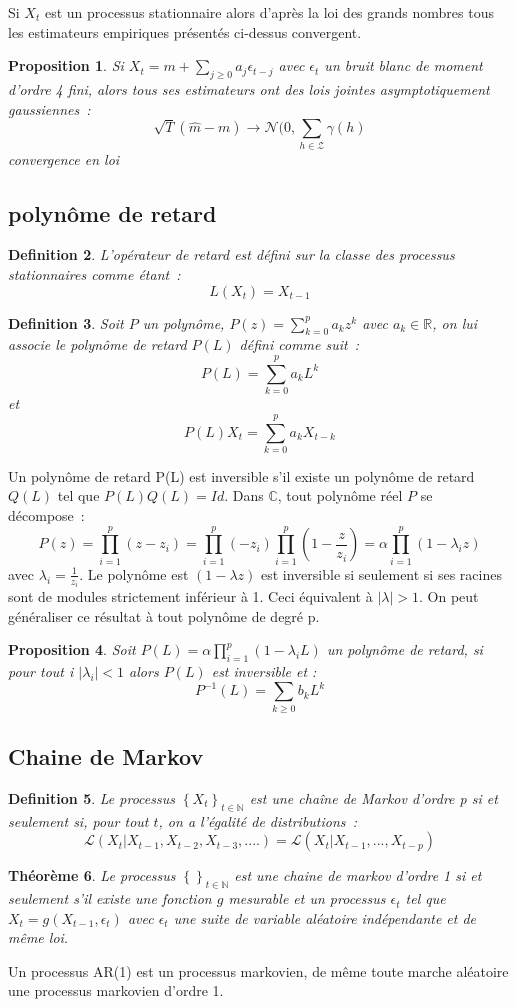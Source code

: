 \documentclass[11pt]{scrartcl} %
\newtheorem{theorem}{Théorème}[section]
\newtheorem{Def}[theorem]{Definition}
\newtheorem{pro}[theorem]{Proposition}
\begin{document}
Si $X_t$ est un processus stationnaire alors d'après la loi des grands nombres tous les estimateurs empiriques présentés ci-dessus convergent.

\begin{pro}
Si $X_t=m+\sum_{j\geq 0}a_j\epsilon_{t-j}$ avec $\epsilon_t$ un bruit blanc de moment d'ordre 4 fini, alors tous ses estimateurs ont des lois jointes asymptotiquement gaussiennes~:
$$
\sqrt{T}\left(\hat{m}-m\right)\rightarrow \mathcal{N}(0,\sum_{h\in\mathcal{Z}}\gamma(h)
$$
convergence en loi
\end{pro}
\subsection{polynôme de retard}
\begin{Def}
L'opérateur de retard est défini sur la classe des processus stationnaires comme étant~: 
$$
L(X_t)=X_{t-1}
$$
\end{Def}
\begin{Def}
Soit $P$ un polynôme, $P(z)=\sum_{k=0}^{p}a_kz^k$ avec $a_k\in\mathbb{R}$, on lui associe le polynôme de retard $P(L)$ défini comme suit~:
$$
P(L)=\sum_{k=0}^pa_kL^k
$$
et 
$$
P(L)X_t=\sum_{k=0}^pa_kX_{t-k}
$$
\end{Def}
Un polynôme de retard P(L) est inversible s'il existe un polynôme de retard $Q(L)$ tel que $P(L)Q(L)=Id$. Dans $\mathbb{C}$, tout polynôme réel $P$ se décompose~:
$$
P(z)=\prod_{i=1}^p(z-z_i)=\prod_{i=1}^p(-z_i)\prod_{i=1}^p(1-\frac{z}{z_i})=\alpha\prod_{i=1}^p(1-\lambda_i z)
$$
avec $\lambda_i=\frac{1}{z_i}$.
Le polynôme est $(1-\lambda z)$ est inversible si seulement si ses racines sont de modules strictement inférieur à 1. Ceci équivalent à $|\lambda|>1$. On peut généraliser ce résultat à tout polynôme de degré p.
\begin{pro}
Soit $P(L) = \alpha\prod_{i=1}^p(1-\lambda_i L)$ un polynôme de retard, si pour tout i $|\lambda_i|<1$ alors $P(L)$ est inversible et :
$$
P^{-1}(L)= \sum_{k\geq 0}b_kL^k
$$
\end{pro}

\subsection{Chaine de Markov}
\begin{Def}
Le processus $\left\{X_t\right\}_{t\in\mathbb{N}}$ est une chaîne de Markov d'ordre p si et seulement si, pour tout $t$, on a l'égalité de distributions~:
$$
\mathcal{L}\left(X_t|X_{t-1},X_{t-2},X_{t-3},....\right) = \mathcal{L}\left(X_t|X_{t-1},...,X_{t-p}\right)
$$
\end{Def}
\begin{theorem}
Le processus $\left\{\right\}_{t\in\mathbb{N}}$ est une chaine de markov d'ordre 1 si et seulement s'il existe une fonction $g$ mesurable et un processus $\epsilon_t$ tel que $X_t=g(X_{t-1},\epsilon_t)$ avec $\epsilon_t$ une suite de variable aléatoire indépendante et de même loi.
\end{theorem}
Un processus AR(1) est un processus markovien, de même toute marche aléatoire une processus markovien d'ordre 1.
\end{document}
